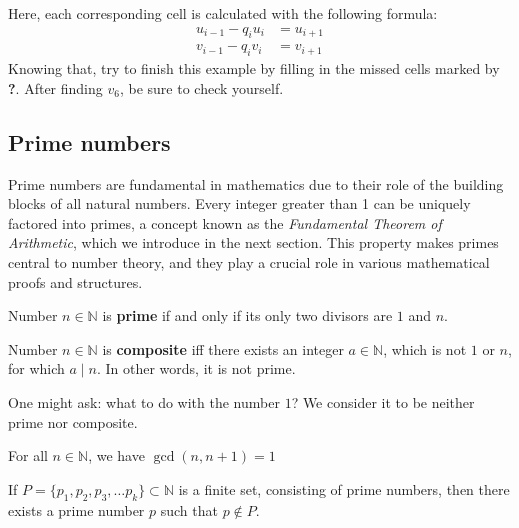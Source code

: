 \documentclass[../lecture-notes-148x210.tex]{subfiles}
\begin{document}
\begin{example} 
\begin{minipage}{0.7\textwidth}
{\begin{tabular}{|c|c|c|c|c|c|c|c|}
                \hline
            \end{tabular}
        }
    \end{minipage}

    \hfill
    
    Here, each corresponding cell is calculated with the following formula: 
    \begin{align*}
        u_{i-1} - q_i u_i &= u_{i+1} \\
        v_{i-1} - q_i v_i &= v_{i+1} 
    \end{align*}
    Knowing that, try to finish this example by filling in the missed cells
    marked by \textcolor{green!60!black}{\textbf{?}}. After finding $v_6$, be
    sure to check yourself.
\end{example}

\subsection{Prime numbers}

Prime numbers are fundamental in mathematics due to their role of the building
blocks of all natural numbers. Every integer greater than 1 can be uniquely
factored into primes, a concept known as the \emph{Fundamental Theorem of
Arithmetic}, which we introduce in the next section. This property makes primes
central to number theory, and they play a crucial role in various mathematical
proofs and structures.

\begin{definition}
    Number $n \in \mathbb{N}$ is \textbf{prime} if and only if its only two divisors are $1$
    and $n$. 
\end{definition}

\begin{definition}
    Number $n \in \mathbb{N}$ is \textbf{composite} iff there exists an integer
    $a \in \mathbb{N}$, which is not $1$ or $n$, for which $a \mid n$. In other words,
    it is not prime.
\end{definition}

\begin{remark}
    One might ask: what to do with the number $1$? We consider it to
    be neither prime nor composite.
\end{remark}

\begin{lemma}
    For all $n \in \mathbb{N}$, we have $\gcd(n, n+1) = 1$
\end{lemma}

\begin{theorem} 
    If $P = \{p_1, p_2, p_3, \dots p_k\} \subset \mathbb{N}$ is a finite set,
    consisting of prime numbers, then there exists a prime number $p$ such that
    $p \notin P$.
\end{theorem}
\end{document}
